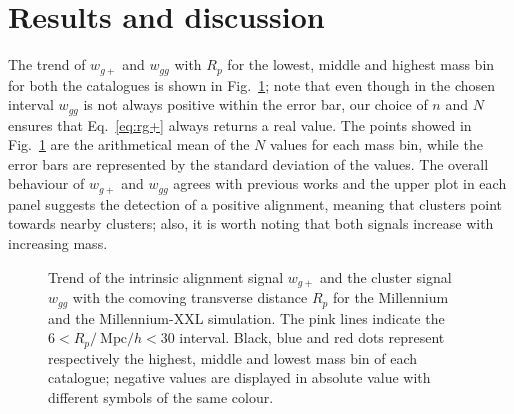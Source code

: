 \documentclass[a4paper,fleqn,usenatbib]{mnras}
\begin{document}
\section{Results and discussion}
\label{sec:resanddiscuss}
The trend of $w_{g+}$ and $w_{gg}$ with $R_p$ for the lowest, middle and highest mass bin for both the catalogues is shown in Fig.~\ref{fig:wgpwggrp}; note that even though in the chosen interval $w_{gg}$ is not always positive within the error bar, our choice of $n$ and $N$ ensures that Eq.~\ref{eq:rg+} always returns a real value. The points showed in Fig.~\ref{fig:wgpwggrp} are the arithmetical mean of the $N$ values for each mass bin, while the error bars are represented by the standard deviation of the values.
The overall behaviour of $w_{g+}$ and $w_{gg}$ agrees with previous works \citep{Joachimietal2011, vanUitertJoachimi2017} and the upper plot in each panel suggests the detection of a positive alignment, meaning that clusters point towards nearby clusters; also, it is worth noting that both signals increase with increasing mass.
\begin{figure}
	\centerline{
	}
	\centerline{
	}
	\caption{Trend of the intrinsic alignment signal $w_{g+}$ and the cluster signal $w_{gg}$ with the comoving transverse distance $R_p$ for \protect{} the Millennium and \protect{} the Millennium-XXL simulation. The pink lines indicate the $6 < R_p / \ \mbox{Mpc}/h < 30 $ interval. Black, blue and red dots represent respectively the highest, middle and lowest mass bin of each catalogue; negative values are displayed in absolute value with different symbols of the same colour.}
	\label{fig:wgpwggrp}
\end{figure}
\end{document}
